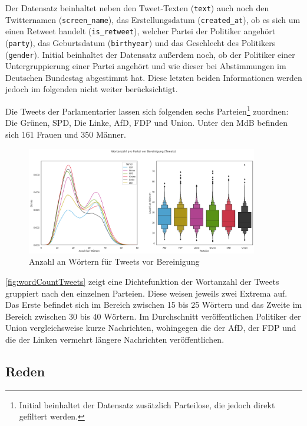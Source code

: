 Der Datensatz beinhaltet neben den Tweet-Texten (\texttt{text}) auch noch den Twitternamen (\texttt{screen\_name}), das Erstellungsdatum (\texttt{created\_at}), ob es sich um einen Retweet handelt (\texttt{is\_retweet}), welcher Partei der Politiker angehört (\texttt{party}), das Geburtsdatum (\texttt{birthyear}) und das Geschlecht des Politikers (\texttt{gender}). Initial beinhaltet der Datensatz außerdem noch, ob der Politiker einer Untergruppierung einer Partei angehört und wie dieser bei Abstimmungen im Deutschen Bundestag abgestimmt hat. Diese letzten beiden Informationen werden jedoch im folgenden nicht weiter berücksichtigt.

Die Tweets der Parlamentarier lassen sich folgenden sechs Parteien\footnote{Initial beinhaltet der Datensatz zusätzlich Parteilose, die jedoch direkt gefiltert werden.} zuordnen: Die Grünen, \ac{SPD}, Die Linke, \ac{AfD}, \ac{FDP} und Union. Unter den \ac{MdB} befinden sich \num{161} Frauen und \num{350} Männer.

\begin{figure}[H]
    \centering
    \includegraphics[width=0.9\textwidth]{data/images/tweets/wortanzahl_pro_partei_vor_bereinigung.png}
    \caption{Anzahl an Wörtern für Tweets vor Bereinigung} \label{fig:wordCountTweets}
\end{figure}

\autoref{fig:wordCountTweets} zeigt eine Dichtefunktion der Wortanzahl der Tweets gruppiert nach den einzelnen Parteien. Diese weisen jeweils zwei Extrema auf. Das Erste befindet sich im Bereich zwischen \num{15} bis \num{25} Wörtern und das Zweite im Bereich zwischen \num{30} bis \num{40} Wörtern. Im Durchschnitt veröffentlichen Politiker der Union vergleichsweise kurze Nachrichten, wohingegen die der \ac{AfD}, der \ac{FDP} und die der Linken vermehrt längere Nachrichten veröffentlichen.

\subsection*{Reden} \label{subsec:dataUnderstandingReden}

